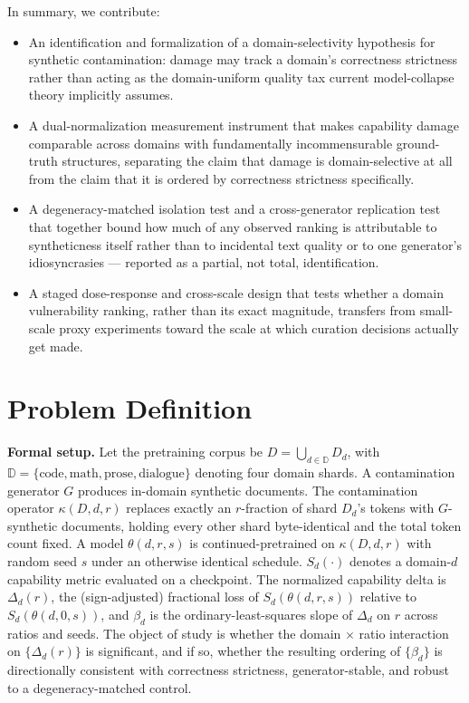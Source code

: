 \documentclass[11pt]{article}
\begin{document}
In summary, we contribute:
\begin{itemize}[leftmargin=1.4em]
\item An identification and formalization of a domain-selectivity hypothesis for synthetic contamination: damage may track a domain's correctness strictness rather than acting as the domain-uniform quality tax current model-collapse theory implicitly assumes.
\item A dual-normalization measurement instrument that makes capability damage comparable across domains with fundamentally incommensurable ground-truth structures, separating the claim that damage is domain-selective at all from the claim that it is ordered by correctness strictness specifically.
\item A degeneracy-matched isolation test and a cross-generator replication test that together bound how much of any observed ranking is attributable to syntheticness itself rather than to incidental text quality or to one generator's idiosyncrasies --- reported as a partial, not total, identification.
\item A staged dose-response and cross-scale design that tests whether a domain vulnerability ranking, rather than its exact magnitude, transfers from small-scale proxy experiments toward the scale at which curation decisions actually get made.
\end{itemize}

\section{Problem Definition}

\noindent\textbf{Formal setup.} Let the pretraining corpus be $D = \bigcup_{d \in \mathbb{D}} D_d$, with $\mathbb{D} = \{\text{code}, \text{math}, \text{prose}, \text{dialogue}\}$ denoting four domain shards. A contamination generator $G$ produces in-domain synthetic documents. The contamination operator $\kappa(D, d, r)$ replaces exactly an $r$-fraction of shard $D_d$'s tokens with $G$-synthetic documents, holding every other shard byte-identical and the total token count fixed. A model $\theta(d, r, s)$ is continued-pretrained on $\kappa(D, d, r)$ with random seed $s$ under an otherwise identical schedule. $S_d(\cdot)$ denotes a domain-$d$ capability metric evaluated on a checkpoint. The normalized capability delta is $\Delta_d(r)$, the (sign-adjusted) fractional loss of $S_d(\theta(d,r,s))$ relative to $S_d(\theta(d,0,s))$, and $\beta_d$ is the ordinary-least-squares slope of $\Delta_d$ on $r$ across ratios and seeds. The object of study is whether the domain $\times$ ratio interaction on $\{\Delta_d(r)\}$ is significant, and if so, whether the resulting ordering of $\{\beta_d\}$ is directionally consistent with correctness strictness, generator-stable, and robust to a degeneracy-matched control.
\end{document}
